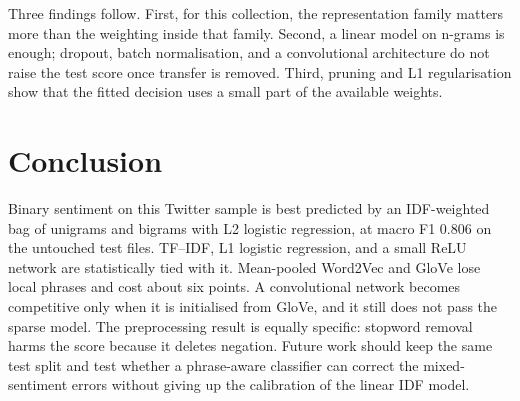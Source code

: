 \documentclass[conference]{IEEEtran}
\begin{document}
Three findings follow. First, for this collection, the representation family matters more than the weighting inside that family. Second, a linear model on n-grams is enough; dropout, batch normalisation, and a convolutional architecture do not raise the test score once transfer is removed. Third, pruning and L1 regularisation show that the fitted decision uses a small part of the available weights.

\section{Conclusion}
Binary sentiment on this Twitter sample is best predicted by an IDF-weighted bag of unigrams and bigrams with L2 logistic regression, at macro F1 0.806 on the untouched test files. TF--IDF, L1 logistic regression, and a small ReLU network are statistically tied with it. Mean-pooled Word2Vec and GloVe lose local phrases and cost about six points. A convolutional network becomes competitive only when it is initialised from GloVe, and it still does not pass the sparse model. The preprocessing result is equally specific: stopword removal harms the score because it deletes negation. Future work should keep the same test split and test whether a phrase-aware classifier can correct the mixed-sentiment errors without giving up the calibration of the linear IDF model.



\end{document}
